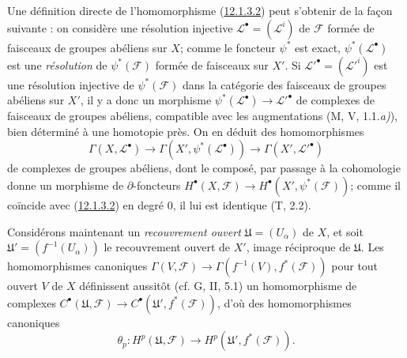 \begin{env}[12.1.4]
\label{0.12.1.4-fr}
Une définition directe de l'homomorphisme
(\hyperref[0.12.1.3.2-fr]{12.1.3.2}) peut s'obtenir de la façon suivante : on
considère une résolution injective $\mathcal L^\bullet=(\mathcal L^i)$ de
$\mathcal F$ formée de faisceaux de groupes abéliens sur $X$; comme le
foncteur $\psi^*$ est exact, $\psi^*(\mathcal L^\bullet)$ est une \emph{résolution}
de $\psi^*(\mathcal F)$ formée de faisceaux sur $X'$. Si
$\mathcal L'^\bullet=(\mathcal L'^i)$ est une résolution injective de
$\psi^*(\mathcal F)$ dans la catégorie des faisceaux de groupes abéliens sur
$X'$, il y a donc un morphisme
$\psi^*(\mathcal L^\bullet)\to\mathcal L'^\bullet$ de complexes de faisceaux
de groupes abéliens, compatible avec les augmentations (M, V, 1.1.\emph{a)}), bien
déterminé à une homotopie près. On en déduit des homomorphismes
\[
\Gamma(X,\mathcal L^\bullet)\longrightarrow
\Gamma(X',\psi^*(\mathcal L^\bullet))\longrightarrow
\Gamma(X',\mathcal L'^\bullet)
\]
de complexes de groupes abéliens, dont le composé, par passage à la
cohomologie donne un morphisme de $\partial$-foncteurs
$H^\bullet(X,\mathcal F)\to H^\bullet(X',\psi^*(\mathcal F))$; comme il
coïncide avec (\hyperref[0.12.1.3.2-fr]{12.1.3.2}) en degré 0, il lui est
identique (T, 2.2).

Considérons maintenant un \emph{recouvrement ouvert}
$\mathfrak U=(U_\alpha)$ de $X$, et soit
$\mathfrak U'=(f^{-1}(U_\alpha))$ le recouvrement ouvert de $X'$, image
réciproque de $\mathfrak U$. Les homomorphismes canoniques
$\Gamma(V,\mathcal F)\to\Gamma(f^{-1}(V),f^*(\mathcal F))$ pour tout ouvert
$V$ de $X$ définissent aussitôt (cf. G, II, 5.1) un homomorphisme de complexes
$C^\bullet(\mathfrak U,\mathcal F)\to
C^\bullet(\mathfrak U',f^*(\mathcal F))$, d'où des homomorphismes
canoniques
\[
\label{0.12.1.4.1-fr}
\tag{12.1.4.1}
\theta_p:H^p(\mathfrak U,\mathcal F)
\longrightarrow H^p(\mathfrak U',f^*(\mathcal F)).
\]


\end{env}
